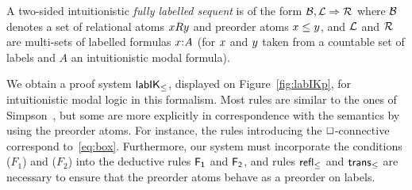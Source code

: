 \documentclass[twoside]{aiml20}
\begin{document}
\begin{definition}
	A two-sided intuitionistic \emph{fully labelled sequent} is of the form $\mathcal{B}, \mathcal{L} \Rightarrow \mathcal{R}$ where $\mathcal{B}$ denotes a set of relational atoms $xRy$ and preorder atoms $x\le{y}$, and $\mathcal{L}$ and $\mathcal{R}$ are multi-sets of labelled formulas $x\mathord{:}A$ (for $x$ and $y$ taken from a countable set of labels and $A$ an intuitionistic modal formula).
\end{definition}






%
We obtain a proof system $\mathsf{lab}\mathsf{IK}_{\le}$, displayed on Figure~\ref{fig:labIKp}, for intuitionistic modal logic in this formalism. 
%
Most rules are similar to the ones of Simpson~\cite{simpson1994}, but some are more explicitly in correspondence with the semantics by using the preorder atoms. 
%
For instance, the rules introducing the $\mathord{\Box}$-connective correspond to~\eqref{eq:box}.
%
Furthermore, our system must incorporate the conditions ($F_1$) and ($F_2$) into the deductive rules $\mathsf{F_1}$ and $\mathsf{F_2}$, and rules $\mathsf{refl_\le}$ and $\mathsf{trans_\le}$ are necessary to ensure that the preorder atoms behave as a preorder on labels.
%

%
%

\end{document}
